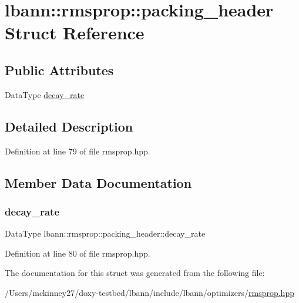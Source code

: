 \hypertarget{structlbann_1_1rmsprop_1_1packing__header}{}\section{lbann\+:\+:rmsprop\+:\+:packing\+\_\+header Struct Reference}
\label{structlbann_1_1rmsprop_1_1packing__header}
\subsection*{Public Attributes}
\begin{DoxyCompactItemize}
\item 
Data\+Type \hyperlink{structlbann_1_1rmsprop_1_1packing__header_afcc77a62f3887d880c35d2481031df44}{decay\+\_\+rate}
\end{DoxyCompactItemize}


\subsection{Detailed Description}


Definition at line 79 of file rmsprop.\+hpp.



\subsection{Member Data Documentation}
\mbox{\label{structlbann_1_1rmsprop_1_1packing__header_afcc77a62f3887d880c35d2481031df44}} 
\subsubsection{\texorpdfstring{decay\+\_\+rate}{decay\_rate}}
{\footnotesize\ttfamily Data\+Type lbann\+::rmsprop\+::packing\+\_\+header\+::decay\+\_\+rate}



Definition at line 80 of file rmsprop.\+hpp.



The documentation for this struct was generated from the following file\+:\begin{DoxyCompactItemize}
\item 
/\+Users/mckinney27/doxy-\/testbed/lbann/include/lbann/optimizers/\hyperlink{rmsprop_8hpp}{rmsprop.\+hpp}\end{DoxyCompactItemize}
